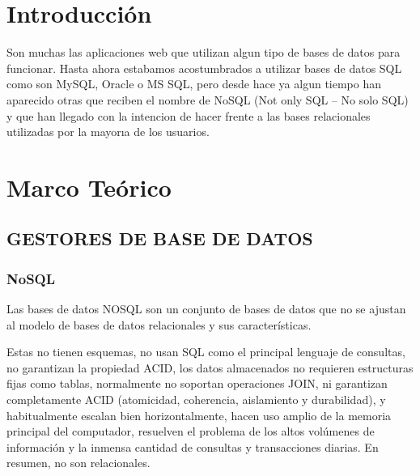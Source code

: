 \documentclass[preprint,12pt]{elsarticle}
\begin{document}
\section{Introducción} 
Son muchas las aplicaciones web que utilizan algun
tipo de bases de datos para funcionar. Hasta ahora
estabamos acostumbrados a utilizar bases de datos SQL
como son MySQL, Oracle o MS SQL, pero desde hace
ya algun tiempo han aparecido otras que reciben el nombre de NoSQL (Not only SQL – No solo SQL) y que
han llegado con la intencion de hacer frente a las bases
relacionales utilizadas por la mayorıa de los usuarios.







\section{Marco Teórico}


\subsection {\textbf{GESTORES DE BASE DE DATOS}}

\subsubsection{\textbf{NoSQL}}

Las bases de datos NOSQL son un conjunto de bases de datos que no se ajustan al modelo de bases de datos relacionales y sus características.

Estas no tienen esquemas, no usan SQL como el principal lenguaje de consultas, no garantizan la propiedad ACID, los datos almacenados no requieren estructuras fijas como tablas,  normalmente no soportan operaciones JOIN, ni garantizan completamente ACID (atomicidad, coherencia, aislamiento y durabilidad), y habitualmente escalan bien horizontalmente, hacen uso amplio de la memoria principal del computador, resuelven el problema de los altos volúmenes de información y la inmensa cantidad de consultas y transacciones diarias. En resumen, no son relacionales.


\cite{Gartner} 
\end{document}
